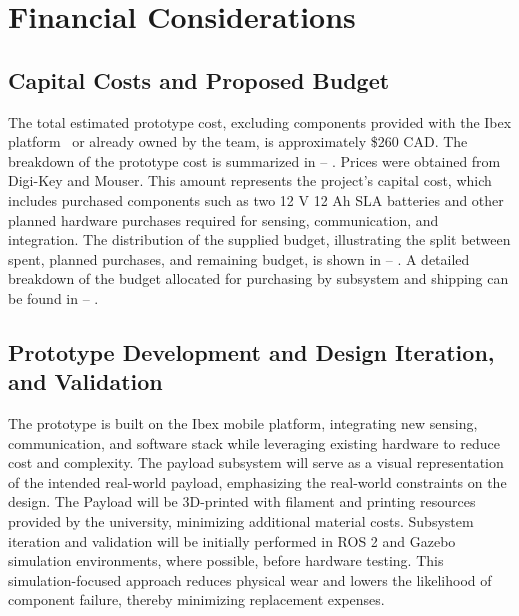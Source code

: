 \section{Financial Considerations}
\label{sec:financial considerations}

\subsection{Capital Costs and Proposed Budget}
\label{sec:capital_costs}
The total estimated prototype cost, excluding components provided with the Ibex platform~\cite{caldwell2018design} or already owned by the team, is approximately \$260 CAD. The breakdown of the prototype cost is summarized in --%
. 
Prices were obtained from Digi-Key and Mouser. This amount represents the project’s capital cost, which includes purchased components such as two 12 V 12 Ah SLA batteries and other planned hardware purchases required for sensing, communication, and integration. The distribution of the supplied budget, illustrating the split between spent, planned purchases, and remaining budget, is shown in --%
.
A detailed breakdown of the budget allocated for purchasing by subsystem and shipping can be found in --%
.

\subsection{Prototype Development and Design Iteration, and Validation}
\label{sec:prototype_development}
The prototype is built on the Ibex mobile platform, integrating new sensing, communication, and software stack while leveraging existing hardware to reduce cost and complexity. The payload subsystem will serve as a visual representation of the intended real-world payload, emphasizing the real-world constraints on the design. The Payload will be 3D-printed with filament and printing resources provided by the university, minimizing additional material costs. Subsystem iteration and validation will be initially performed in ROS 2 and Gazebo simulation environments, where possible, before hardware testing. This simulation-focused approach reduces physical wear and lowers the likelihood of component failure, thereby minimizing replacement expenses.

